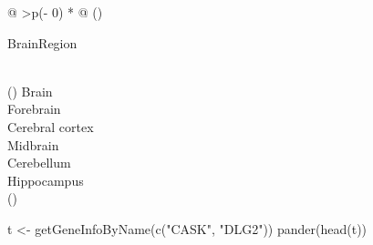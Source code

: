 \documentclass[
]{article}
\newenvironment{Shaded}{\begin{snugshade}}{\end{snugshade}}
\newcommand{\FunctionTok}[1]{\textcolor[rgb]{0.00,0.00,0.00}{#1}}
\newcommand{\NormalTok}[1]{#1}
\newcommand{\OtherTok}[1]{\textcolor[rgb]{0.56,0.35,0.01}{#1}}
\newcommand{\StringTok}[1]{\textcolor[rgb]{0.31,0.60,0.02}{#1}}
\begin{document}
\begin{longtable}[]{@{}
  >{\centering\arraybackslash}p{(\columnwidth - 0\tabcolsep) * }@{}}
\toprule()
\begin{minipage}[b]{\linewidth}\centering
BrainRegion
\end{minipage} \\
\midrule()
\endhead
Brain \\
Forebrain \\
Cerebral cortex \\
Midbrain \\
Cerebellum \\
Hippocampus \\
\bottomrule()
\end{longtable}

\begin{Shaded}
\begin{Highlighting}[]

\NormalTok{t }\OtherTok{\textless{}{-}} \FunctionTok{getGeneInfoByName}\NormalTok{(}\FunctionTok{c}\NormalTok{(}\StringTok{"CASK"}\NormalTok{, }\StringTok{"DLG2"}\NormalTok{))}
\FunctionTok{pander}\NormalTok{(}\FunctionTok{head}\NormalTok{(t))                      }
\end{Highlighting}
\end{Shaded}
\end{document}
